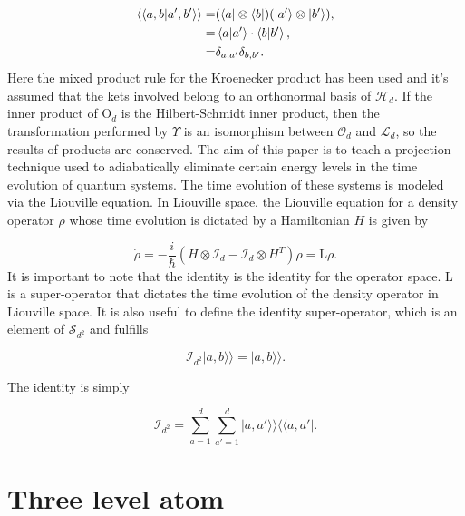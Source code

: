 \documentclass[12pt]{article}
\newcommand{\superket}[1]{|#1\rangle\rangle}
\newcommand{\superbracket}[2]{\langle\langle #1 |#2\rangle\rangle}
\newcommand{\supermatrix}[2]{|#1\rangle\rangle\langle\langle #2|}
\begin{document}
\begin{align*}
    \superbracket{a,b}{a',b'} =& (\bra{a}\otimes\bra{b})(\ket{a'}\otimes\ket{b'}),\\
    =& \braket{a}{a'}\cdot\braket{b}{b'},\\
    =& \delta_{a,a'} \delta_{b,b'}.
\end{align*} Here the mixed product rule for the Kroenecker product has been used and it's assumed that the kets involved belong to an orthonormal basis of $\mathcal{H}_d$. If the inner product of $\mathrm{O}_d$ is the Hilbert-Schmidt inner product, then the transformation performed by $\Upsilon$ is an isomorphism between $\mathcal{O}_d$ and $\mathcal{L}_d$, so the results of products are conserved. The aim of this paper is to teach a projection technique used to adiabatically eliminate certain energy levels in the time evolution of quantum systems. The time evolution of these systems is modeled via the Liouville equation. In Liouville space, the Liouville equation for a density operator $\rho$ whose time evolution is dictated by a Hamiltonian $H$ is given by

\begin{equation}\label{eq:LiouvilleSpaceLiouvillian}
     \dot{\rho} = -\frac{i}{\hbar}(H\otimes \mathcal{I}_d - \mathcal{I}_d \otimes H^T )\rho = \mathrm{L}\rho.
\end{equation} It is important to note that the identity is the identity for the operator space. $\mathrm{L}$ is a super-operator that dictates the time evolution of the density operator in Liouville space. It is also useful to define the identity super-operator, which is an element of $\mathcal{S}_{d^2}$ and fulfills

\begin{equation}
    \mathcal{I}_{d^2}\superket{a,b} = \superket{a,b}.
\end{equation}

The identity is simply

\begin{equation}
    \mathcal{I}_{d^2}= \sum_{a=1}^d \sum_{a'=1}^d \supermatrix{a,a'}{a,a'}.
\end{equation} 

\section{Three level atom}\label{sect:ThreeLevelAtom}
\end{document}
